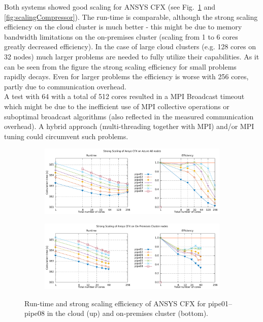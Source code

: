 \documentclass[a4paper,twoside]{article}
\begin{document}
Both systems showed good scaling for ANSYS CFX (see Fig.~\ref{fig:strongHSR} and \ref{fig:scalingCompressor}). The run-time is comparable, although the strong scaling efficiency on the cloud cluster is much better - this might be due to memory bandwidth limitations on the on-premises cluster (scaling from 1 to 6 cores greatly decreased efficiency).  In the case of large cloud clusters (e.g. 128 cores on 32 nodes) much larger problems are needed to fully utilize their capabilities. As it can be seen from the figure the strong scaling efficiency for small problems rapidly decays. Even for larger problems the efficiency is worse with 256 cores, partly due to communication overhead. \\
A test with 64 with a total of 512 cores resulted in a MPI Broadcast timeout which might be due to the inefficient use of MPI collective operations or suboptimal broadcast algorithms (also reflected in the measured communication overhead). A hybrid approach (multi-threading together with MPI) and/or MPI tuning could circumvent such problems.

\onecolumn
\begin{figure}
	\begin{subfigure}
		\centering
		\includegraphics[width=0.8\linewidth]{gplt-a8-strong-pipe}			
	\end{subfigure}

		\begin{subfigure}
			\centering
			\includegraphics[width=0.8\linewidth]{gplt-hsr-strong-pipe}			
		\end{subfigure}
	\caption{Run-time and strong scaling efficiency of ANSYS CFX for pipe01--pipe08 in the cloud (up) and on-premises cluster (bottom).}
	\label{fig:strongHSR}
\end{figure}
\end{document}

